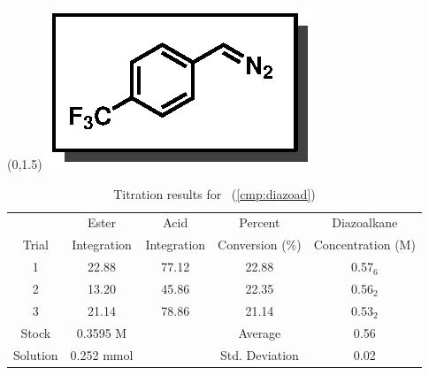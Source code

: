 \begin{singlespace}
\begin{table}[htbp]
\begin{textblock}{1}(0,1.5)
\includegraphics[scale=0.8]{chp_asymmetric/images/diazoad}
\end{textblock}
\flushright
{\small
\begin{tabular}{ccccc} 
\toprule
&Ester&Acid&Percent&Diazoalkane\\
Trial&Integration&Integration&Conversion (\%)&Concentration (M) \\ 
\midrule
1 & 22.88 & 77.12 & 22.88 & 0.57$_6$ \\
2 & 13.20 & 45.86 & 22.35 & 0.56$_2$ \\
3 & 21.14 & 78.86 & 21.14 & 0.53$_2$ \\
\midrule
Stock & 0.3595 M & & Average & 0.56 \\
Solution & 0.252 mmol & & Std. Deviation & 0.02 \\
\bottomrule
\end{tabular}
\caption{Titration results for \CMPdiazoad~(\ref{cmp:diazoad})}
}
\end{table}
\end{singlespace}

